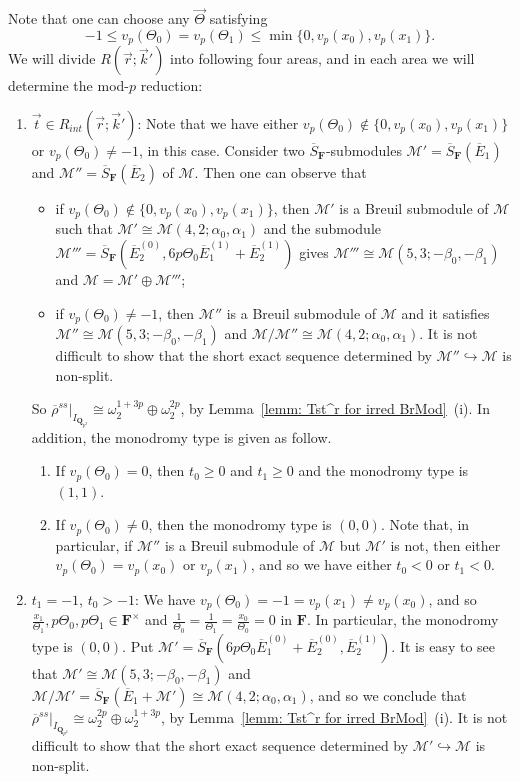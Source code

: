\documentclass[11pt]{amsart}
\theoremstyle{definition}
\numberwithin{equation}{subsection}
\theoremstyle{plain}
\theoremstyle{plain}
\theoremstyle{plain}
\theoremstyle{plain}
\theoremstyle{plain}
\theoremstyle{plain}
\theoremstyle{plain}
\theoremstyle{plain}
\theoremstyle{plain}
\theoremstyle{plain}
\theoremstyle{plain}
\theoremstyle{plain}
\theoremstyle{definition}
\theoremstyle{definition}
\theoremstyle{definition}
\theoremstyle{remark}
\renewcommand{\(}{\textup{(}}
\renewcommand{\)}{\textup{)}}
\newcommand{\Q}{\mathbf{Q}}
\newcommand{\F}{\mathbf{F}}
\newcommand{\barS}{\overline{S}}
\newcommand{\rhobar}{\overline{\rho}}
\newcommand{\cM}{\mathcal{M}}
\newcommand{\barE}{\overline{E}}
\newcommand{\vr}{\vec{r}}
\newcommand{\vk}{\vec{k}}
\newcommand{\vTh}{\vec{\Theta}}
\newcommand{\IQptwo}{{I_{\Q_{p^2}}}}
\begin{document}
Note that one can choose any $\vTh$ satisfying
$$-1\leq v_p(\Theta_0)=v_p(\Theta_1)\leq \min\{0,v_p(x_0),v_p(x_1)\}.$$
We will divide $R(\vr;\vk')$ into following four areas, and in each area we will determine the mod-$p$ reduction:
\begin{enumerate}[leftmargin=*]
  \item $\vec{t}\in R_{int}(\vr;\vk')$: Note that we have either $v_p(\Theta_0)\not\in\{0,v_p(x_0),v_p(x_1)\}$ or $v_p(\Theta_0)\neq -1$, in this case. Consider two $\barS_{\F}$-submodules $\cM'=\barS_{\F}(\barE_1)$ and $\cM''=\barS_{\F}(\barE_2)$ of $\cM$. Then one can observe that
    \begin{itemize}[leftmargin=*]
      \item if $v_p(\Theta_0)\not\in\{0,v_p(x_0),v_p(x_1)\}$, then $\cM'$ is a Breuil submodule of $\cM$ such that $\cM'\cong\cM(4,2;\alpha_0,\alpha_1)$ and the submodule $\cM'''=\barS_\F(\barE_2^{(0)},6p\Theta_0\barE_1^{(1)}+\barE_2^{(1)})$ gives $\cM'''\cong\cM(5,3;-\beta_0,-\beta_1)$ and $\cM=\cM'\oplus\cM'''$;
      \item if $v_p(\Theta_0)\neq -1$, then $\cM''$ is a Breuil submodule of $\cM$ and it satisfies $\cM''\cong\cM(5,3;-\beta_0,-\beta_1)$ and $\cM/\cM''\cong\cM(4,2;\alpha_0,\alpha_1)$. It is not difficult to show that the short exact sequence determined by $\cM''\hookrightarrow\cM$ is non-split.
    \end{itemize}
    So $\rhobar^{ss}|_\IQptwo\cong\omega_2^{1+3p}\oplus\omega_2^{2p}$, by Lemma~\ref{lemm: Tst^r for irred BrMod}~(i). In addition, the monodromy type is given as follow.
    \begin{enumerate}[leftmargin=*]
      \item If $v_p(\Theta_0)=0$, then $t_0\geq 0$ and $t_1\geq 0$ and the monodromy type is $(1,1)$.
      \item If $v_p(\Theta_0)\neq 0$, then the monodromy type is $(0,0)$. Note that, in particular, if $\cM''$ is a Breuil submodule of $\cM$ but $\cM'$ is not, then either $v_p(\Theta_0)=v_p(x_0)$ or $v_p(x_1)$, and so we have either $t_0<0$ or $t_1<0$.
    \end{enumerate}
  \item $t_1=-1$, $t_0>-1$: We have $v_p(\Theta_0)=-1=v_p(x_1)\neq v_p(x_0)$, and so $\frac{x_1}{\Theta_1},p\Theta_0,p\Theta_1\in\F^\times$ and $\frac{1}{\Theta_0}=\frac{1}{\Theta_1}=\frac{x_0}{\Theta_0}=0$ in $\F$. In particular, the monodromy type is $(0,0)$. Put $\cM'=\barS_{\F}(6p\Theta_0\barE_1^{(0)}+\barE_2^{(0)},\barE_2^{(1)})$. It is easy to see that $\cM'\cong\cM(5,3;-\beta_0,-\beta_1)$ and $\cM/\cM'=\barS_{\F}(\barE_1+\cM')\cong\cM(4,2;\alpha_0,\alpha_1)$, and so we conclude that $\rhobar^{ss}|_\IQptwo\cong\omega_2^{2p}\oplus\omega_2^{1+3p}$, by Lemma~\ref{lemm: Tst^r for irred BrMod}~(i). It is not difficult to show that the short exact sequence determined by $\cM'\hookrightarrow \cM$ is non-split.

\end{enumerate}
\end{document}
